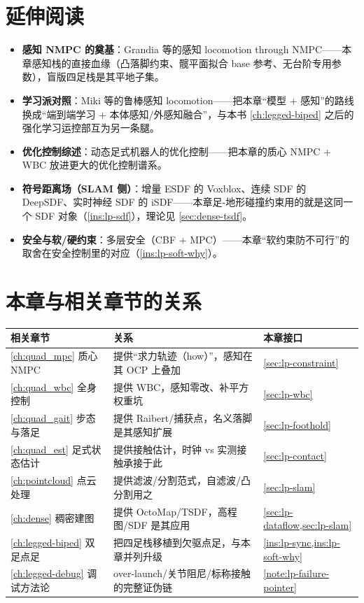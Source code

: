 \section*{延伸阅读}
\begin{itemize}
  \item \textbf{感知 NMPC 的奠基}：Grandia 等的感知 locomotion through NMPC\cite{grandia2022perceptive}——本章感知栈的直接血缘（凸落脚约束、髋平面拟合 base 参考、无台阶专用参数），盲版四足栈是其平地子集。
  \item \textbf{学习派对照}：Miki 等的鲁棒感知 locomotion\cite{miki2022perceptive}——把本章“模型 + 感知”的路线换成“端到端学习 + 本体感知/外感知融合”，与本书 \cref{ch:legged-biped} 之后的强化学习运控部互为另一条腿。
  \item \textbf{优化控制综述}：动态足式机器人的优化控制\cite{wensing2024legged}——把本章的质心 NMPC + WBC 放进更大的优化控制谱系。
  \item \textbf{符号距离场（SLAM 侧）}：增量 ESDF 的 Voxblox\cite{oleynikova2017voxblox}、连续 SDF 的 DeepSDF\cite{park2019deepsdf}、实时神经 SDF 的 iSDF\cite{ortiz2022isdf}——本章足-地形碰撞约束用的就是这同一个 SDF 对象（\cref{ins:lp-sdf}），理论见 \cref{sec:dense-tsdf}。
  \item \textbf{安全与软/硬约束}：多层安全（CBF + MPC）\cite{grandia2021cbf}——本章“软约束防不可行”的取舍在安全控制里的对应（\cref{ins:lp-soft-why}）。
\end{itemize}

\section*{本章与相关章节的关系}
\begin{table}[H]\centering\small
\begin{tabular}{lll}
\toprule
相关章节 & 关系 & 本章接口 \\
\midrule
\cref{ch:quad_mpc} 质心 NMPC & 提供“求力轨迹（how）”，感知在其 OCP 上叠加 & \cref{sec:lp-constraint} \\
\cref{ch:quad_wbc} 全身控制 & 提供 WBC，感知零改、补平方权重坑 & \cref{sec:lp-wbc} \\
\cref{ch:quad_gait} 步态与落足 & 提供 Raibert/捕获点，名义落脚是其感知扩展 & \cref{sec:lp-foothold} \\
\cref{ch:quad_est} 足式状态估计 & 提供接触估计，时钟 vs 实测接触承接于此 & \cref{sec:lp-contact} \\
\cref{ch:pointcloud} 点云处理 & 提供滤波/分割范式，自滤波/凸分割用之 & \cref{sec:lp-slam} \\
\cref{ch:dense} 稠密建图 & 提供 OctoMap/TSDF，高程图/SDF 是其应用 & \cref{sec:lp-dataflow,sec:lp-slam} \\
\cref{ch:legged-biped} 双足点足 & 把四足栈移植到欠驱点足，与本章并列升级 & \cref{ins:lp-sync,ins:lp-soft-why} \\
\cref{ch:legged-debug} 调试方法论 & over-launch/关节阻尼/标称接触的完整证伪链 & \cref{note:lp-failure-pointer} \\
\bottomrule
\end{tabular}
\end{table}

